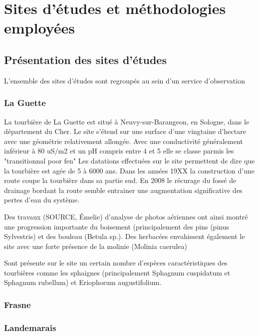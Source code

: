 
\chapter{Sites d'études et méthodologies employées}
\newpage

\section{Présentation des sites d'études}

L'ensemble des sites d'études sont regroupés au sein d'un service d'observation

\subsection{La Guette}

La tourbière de La Guette est situé à Neuvy-sur-Barangeon, en Sologne, dans le département du Cher.
Le site s'étend sur une surface d'une vingtaine d'hectare avec une géométrie relativement allongée.
Avec une conductivité généralement inférieur à 80 uS/m2 et un pH compris entre 4 et 5 elle se classe parmis les "transitionnal poor fen"
Les datations effectuées sur le site permettent de dire que la tourbière est agée de 5 à 6000 ans.
Dans les années 19XX la construction d'une route coupe la tourbière dans sa partie sud.
En 2008 le récurage du fossé de drainage bordant la route semble entrainer une augmentation significative des pertes d'eau du système.

Des travaux (SOURCE, Émelie) d'analyse de photos aériennes ont ainsi montré une progression importante du boisement (principalement des pins (pinus Sylvestris) et des bouleau (Betula sp.). Des herbacées envahissent également le site avec une forte présence de la molinie (Molinia caerulea)

Sont présente sur le site un certain nombre d'espèces caractéristiques des tourbières comme les sphaignes (principalement Sphagnum cuspidatum et Sphagnum rubellum) et Eriophorum augustifolium.


\subsection{Frasne}

\subsection{Landemarais}

